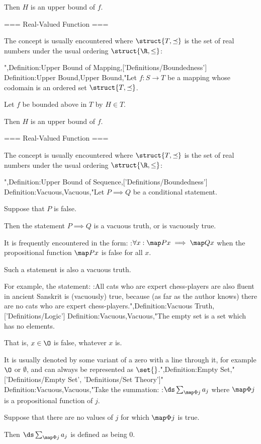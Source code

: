 Then $H$ is an upper bound of $f$.


=== Real-Valued Function ===

The concept is usually encountered where $\struct {T, \preceq}$ is the set of real numbers under the usual ordering $\struct {\R, \le}$:

",Definition:Upper Bound of Mapping,['Definitions/Boundedness']
Definition:Upper Bound,Upper Bound,"Let $f: S \to T$ be a mapping whose codomain is an ordered set $\struct {T, \preceq}$.


Let $f$ be bounded above in $T$ by $H \in T$.


Then $H$ is an upper bound of $f$.


=== Real-Valued Function ===

The concept is usually encountered where $\struct {T, \preceq}$ is the set of real numbers under the usual ordering $\struct {\R, \le}$:


",Definition:Upper Bound of Sequence,['Definitions/Boundedness']
Definition:Vacuous,Vacuous,"Let $P \implies Q$ be a conditional statement.

Suppose that $P$ is false.

Then the statement $P \implies Q$ is a vacuous truth, or is vacuously true.


It is frequently encountered in the form:
:$\forall x: \map P x \implies \map Q x$
when the propositional function $\map P x$ is false for all $x$.

Such a statement is also a vacuous truth.


For example, the statement:
:All cats who are expert chess-players are also fluent in ancient Sanskrit
is (vacuously) true, because (as far as the author knows) there are no cats who are expert chess-players.",Definition:Vacuous Truth,['Definitions/Logic']
Definition:Vacuous,Vacuous,"The empty set is a set which has no elements.

That is, $x \in \O$ is false, whatever $x$ is.


It is usually denoted by some variant of a zero with a line through it, for example $\O$ or $\emptyset$, and can always be represented as $\set {}$.",Definition:Empty Set,"['Definitions/Empty Set', 'Definitions/Set Theory']"
Definition:Vacuous,Vacuous,"Take the summation:
:$\ds \sum_{\map \Phi j} a_j$
where $\map \Phi j$ is a propositional function of $j$.

Suppose that there are no values of $j$ for which $\map \Phi j$ is true.

Then $\ds \sum_{\map \Phi j} a_j$ is defined as being $0$.

